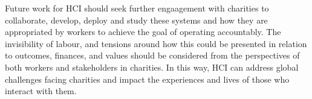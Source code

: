Future work for HCI should seek further engaagement with charities to collaborate, develop, deploy and study these systems and how they are appropriated by workers to achieve the goal of operating accountably. The invisibility of labour, and tensions around how this could be presented in relation to outcomes, finances, and values should be considered from the perspectives of both workers and stakeholders in charities. In this way, HCI can address global challenges facing charities and impact the experiences and lives of those who interact with them.
